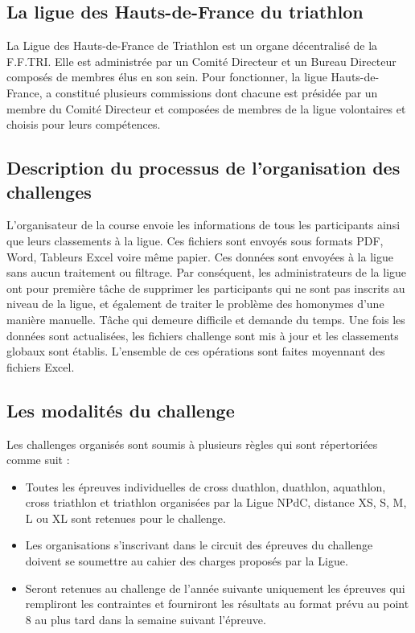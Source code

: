 \documentclass[12pt,a4paper]{report}
\begin{document}
	\subsection{La ligue des Hauts-de-France du triathlon }
	
	La Ligue des Hauts-de-France de Triathlon est un organe décentralisé de la F.F.TRI. Elle est administrée par un Comité Directeur et un Bureau Directeur composés de membres élus en son sein. 
	Pour fonctionner, la ligue Hauts-de-France, a constitué plusieurs commissions dont chacune est présidée par un membre du Comité Directeur et composées de membres de la ligue volontaires et choisis pour leurs compétences.
	
	\subsection{Description du processus de l’organisation des challenges }
	L’organisateur de la course envoie les informations de tous les participants ainsi que leurs classements à la ligue. Ces fichiers sont envoyés sous formats PDF, Word, Tableurs Excel voire même papier.  Ces données sont envoyées à la ligue sans aucun traitement ou filtrage. Par conséquent, les administrateurs de la ligue ont pour première tâche de supprimer les participants qui ne sont pas inscrits au niveau de la ligue, et également de traiter le problème des homonymes d’une manière manuelle. Tâche qui demeure difficile et demande du temps.
	Une fois les données sont actualisées, les fichiers challenge sont mis à jour et les classements globaux sont établis. L’ensemble de ces opérations sont faites moyennant des fichiers Excel.
	
	
	\subsection{Les modalités du challenge  }
	Les challenges organisés sont soumis à plusieurs règles qui sont répertoriées comme suit :
	\begin{itemize} 
	\item 	Toutes les épreuves individuelles de cross duathlon, duathlon, aquathlon, cross triathlon et triathlon organisées par la Ligue NPdC, distance XS, S, M, L ou XL sont retenues pour le challenge.
	\item 	Les organisations s'inscrivant dans le circuit des épreuves du challenge doivent se soumettre au cahier des charges proposés par la Ligue.
	 \item  Seront retenues au challenge de l’année suivante uniquement les épreuves qui rempliront les contraintes et fourniront les résultats au format prévu au point 8 au plus tard dans la semaine suivant l’épreuve.
	
	\end{itemize} 
\end{document}
